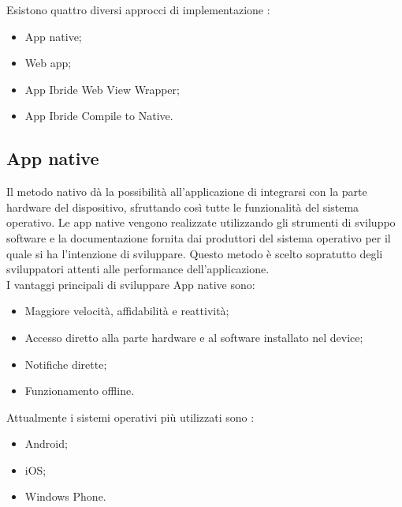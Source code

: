 \newpage

\noindent Esistono quattro diversi approcci di implementazione \cite{differenza,sviluppo,apptonative}: 
\begin{itemize}
	\item App native; 
	\item Web app; 
	\item App Ibride Web View Wrapper; 
	\item App Ibride Compile to Native.
\end{itemize}

\subsection{App native}
Il metodo nativo \cite{differenza,apptonative} dà la possibilità all'applicazione di integrarsi con la parte hardware del dispositivo, sfruttando così tutte le funzionalità del sistema operativo. 
Le app native vengono realizzate utilizzando gli strumenti di sviluppo software e la documentazione fornita dai produttori del sistema operativo per il quale si ha l'intenzione di sviluppare.
Questo metodo è scelto sopratutto degli sviluppatori attenti alle performance dell'applicazione.\\
I vantaggi principali di sviluppare App native sono:
\begin{itemize}
	\item Maggiore velocità, affidabilità e reattività;
	\item Accesso diretto alla parte hardware e al software installato nel device; 
	\item Notifiche dirette;
	\item Funzionamento offline.
\end{itemize}
Attualmente i sistemi operativi più utilizzati sono \cite{sviluppo}:
\begin{itemize}
	\item Android; 
	\item iOS; 
	\item Windows Phone.\\
\end{itemize}

